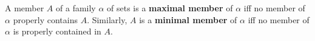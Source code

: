 A member $A$ of a family $\alpha$ of sets is a \textbf{maximal member} of $\alpha$ iff no member of $\alpha$ properly contains $A$. Similarly, $A$ is a \textbf{minimal member} of $\alpha$ iff no member of $\alpha$ is properly contained in $A$.
